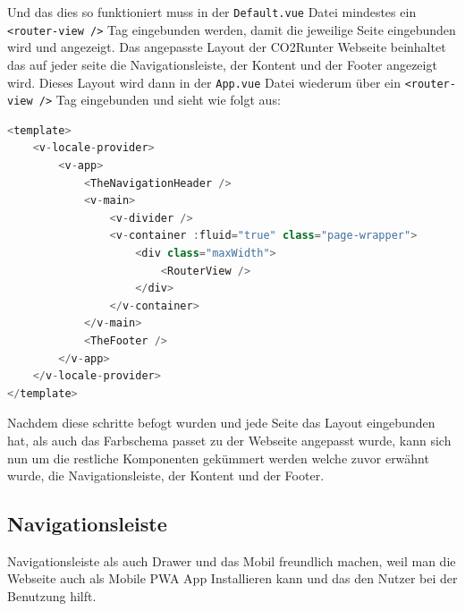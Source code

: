 Und das dies so funktioniert muss in der \texttt{Default.vue} Datei mindestes ein \texttt{<router-view />} Tag eingebunden werden, damit die jeweilige Seite eingebunden wird und angezeigt. Das angepasste Layout der CO2Runter Webseite beinhaltet das auf jeder seite die Navigationsleiste, der Kontent und der Footer angezeigt wird. Dieses Layout wird dann in der \texttt{App.vue} Datei wiederum über ein \texttt{<router-view />} Tag eingebunden und sieht wie folgt aus:

\begin{lstlisting}[language={JavaScript}, caption={Layout Definition}]
<template>
    <v-locale-provider>
        <v-app>
            <TheNavigationHeader />
            <v-main>
                <v-divider />
                <v-container :fluid="true" class="page-wrapper">
                    <div class="maxWidth">
                        <RouterView />
                    </div>
                </v-container>
            </v-main>
            <TheFooter />
        </v-app>
    </v-locale-provider>
</template>
\end{lstlisting}

Nachdem diese schritte befogt wurden und jede Seite das Layout eingebunden hat, als auch das Farbschema passet zu der Webseite angepasst wurde, kann sich nun um die restliche Komponenten gekümmert werden welche zuvor erwähnt wurde, die Navigationsleiste, der Kontent und der Footer.

\subsection{Navigationsleiste}

Navigationsleiste als auch Drawer und das Mobil freundlich machen, weil man die Webseite auch als Mobile PWA App Installieren kann und das den Nutzer bei der Benutzung hilft.

